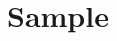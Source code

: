 \documentclass[letterpaper]{book}
\begin{document}
\chapter{Sample}
\testidx

\printindex
\end{document}
